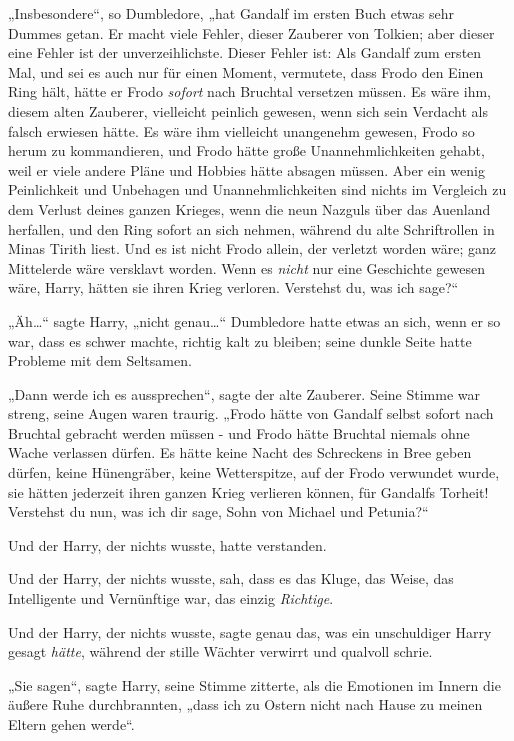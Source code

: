 {„Insbesondere“, so Dumbledore, „hat Gandalf im ersten Buch etwas sehr Dummes getan. Er macht viele Fehler, dieser Zauberer von Tolkien; aber dieser eine Fehler ist der unverzeihlichste. Dieser Fehler ist: Als Gandalf zum ersten Mal, und sei es auch nur für einen Moment, vermutete, dass Frodo den Einen Ring hält, hätte er Frodo \emph{sofort} nach Bruchtal versetzen müssen. Es wäre ihm, diesem alten Zauberer, vielleicht peinlich gewesen, wenn sich sein Verdacht als falsch erwiesen hätte. Es wäre ihm vielleicht unangenehm gewesen, Frodo so herum zu kommandieren, und Frodo hätte große Unannehmlichkeiten gehabt, weil er viele andere Pläne und Hobbies hätte absagen müssen. Aber ein wenig Peinlichkeit und Unbehagen und Unannehmlichkeiten sind nichts im Vergleich zu dem Verlust deines ganzen Krieges, wenn die neun Nazguls über das Auenland herfallen, und den Ring sofort an sich nehmen, während du alte Schriftrollen in Minas Tirith liest. Und es ist nicht Frodo allein, der verletzt worden wäre; ganz Mittelerde wäre versklavt worden. Wenn es \emph{nicht} nur eine Geschichte gewesen wäre, Harry, hätten sie ihren Krieg verloren. Verstehst du, was ich sage?“

„Äh…“ sagte Harry, „nicht genau…“ Dumbledore hatte etwas an sich, wenn er so war, dass es schwer machte, richtig kalt zu bleiben; seine dunkle Seite hatte Probleme mit dem Seltsamen.

„Dann werde ich es aussprechen“, sagte der alte Zauberer. Seine Stimme war streng, seine Augen waren traurig. „Frodo hätte von Gandalf selbst sofort nach Bruchtal gebracht werden müssen - und Frodo hätte Bruchtal niemals ohne Wache verlassen dürfen. Es hätte keine Nacht des Schreckens in Bree geben dürfen, keine Hünengräber, keine Wetterspitze, auf der Frodo verwundet wurde, sie hätten jederzeit ihren ganzen Krieg verlieren können, für Gandalfs Torheit! Verstehst du nun, was ich dir sage, Sohn von Michael und Petunia?“

Und der Harry, der nichts wusste, hatte verstanden.

Und der Harry, der nichts wusste, sah, dass es das Kluge, das Weise, das Intelligente und Vernünftige war, das einzig \emph{Richtige}.

Und der Harry, der nichts wusste, sagte genau das, was ein unschuldiger Harry gesagt \emph{hätte}, während der stille Wächter verwirrt und qualvoll schrie.

„Sie sagen“, sagte Harry, seine Stimme zitterte, als die Emotionen im Innern die äußere Ruhe durchbrannten, „dass ich zu Ostern nicht nach Hause zu meinen Eltern gehen werde“.

}
